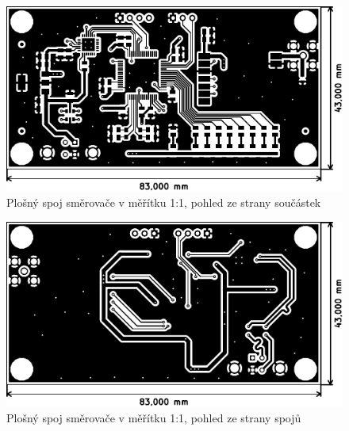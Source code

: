 \begin{figure}[h]
    \centering
    \includegraphics{pcb/router-top}
    \caption{Plošný spoj směrovače v měřítku 1:1, pohled ze strany součástek}
\end{figure}
\begin{figure}[h]
    \centering
    \includegraphics{pcb/router-bot}
    \caption{Plošný spoj směrovače v měřítku 1:1, pohled ze strany spojů}
\end{figure}

